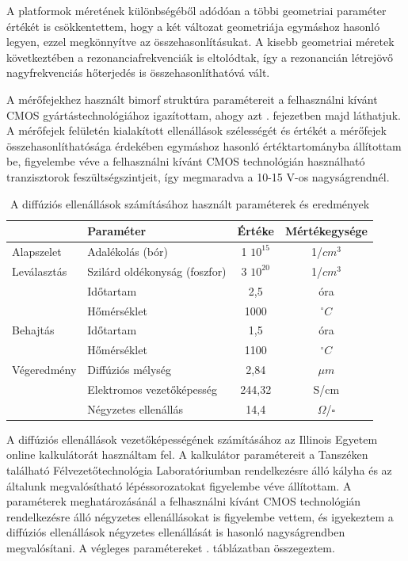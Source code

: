 A platformok méretének különbségéből adódóan a többi geometriai paraméter értékét is csökkentettem, hogy a két változat geometriája egymáshoz hasonló legyen, ezzel megkönnyítve az összehasonlításukat. A kisebb geometriai méretek következtében a rezonanciafrekvenciák is eltolódtak, így a rezonancián létrejövő nagyfrekvenciás hőterjedés is összehasonlíthatóvá vált.

A mérőfejekhez használt bimorf struktúra paramétereit a felhasználni kívánt CMOS gyártástechnológiához igazítottam, ahogy azt . fejezetben majd láthatjuk. A mérőfejek felületén kialakított ellenállások szélességét és értékét a mérőfejek összehasonlíthatósága érdekében egymáshoz hasonló értéktartományba állítottam be, figyelembe véve a felhasználni kívánt CMOS technológián használható tranzisztorok feszültségszintjeit, így megmaradva a 10-15 V-os nagyságrendnél.

\renewcommand{\arraystretch}{1.2}
\begin{table}[!ht]
    \centering
    \begin{tabular}{@{}llcc@{}}
        \toprule
        & \textbf{Paraméter} & \textbf{Értéke} & \textbf{Mértékegysége} \\
        \hline
        Alapszelet & Adalékolás (bór) & 1 $10^{15}$ & 1/$ cm^3 $ \\
        Leválasztás & Szilárd oldékonyság (foszfor) & 3 $10^{20}$ & 1/$cm^3$ \\
        & Időtartam & 2,5 & óra \\
        & Hőmérséklet & 1000 & $^\circ C$ \\
        Behajtás & Időtartam & 1,5 & óra \\
        & Hőmérséklet & 1100 & $^\circ C$ \\
        Végeredmény & Diffúziós mélység & 2,84 & $\mu m$ \\
        & Elektromos vezetőképesség & 244,32 & S/cm \\
        & Négyzetes ellenállás & 14,4 & $\Omega$/$\square$ \\
        \bottomrule
    \end{tabular}
    \caption{A diffúziós ellenállások számításához használt paraméterek és eredmények}
    \label{tab:diffusion}
\end{table}

A diffúziós ellenállások vezetőképességének számításához az Illinois Egyetem online kalkulátorát használtam fel\cite{Illinois_diffusion}. A kalkulátor paramétereit a Tanszéken található Félvezetőtechnológia Laboratóriumban rendelkezésre álló kályha és az általunk megvalósítható lépéssorozatokat figyelembe véve állítottam. A paraméterek meghatározásánál a felhasználni kívánt CMOS technológián rendelkezésre álló négyzetes ellenállásokat is figyelembe vettem, és igyekeztem a diffúziós ellenállások négyzetes ellenállását is hasonló nagyságrendben megvalósítani. A végleges paramétereket . táblázatban összegeztem.

